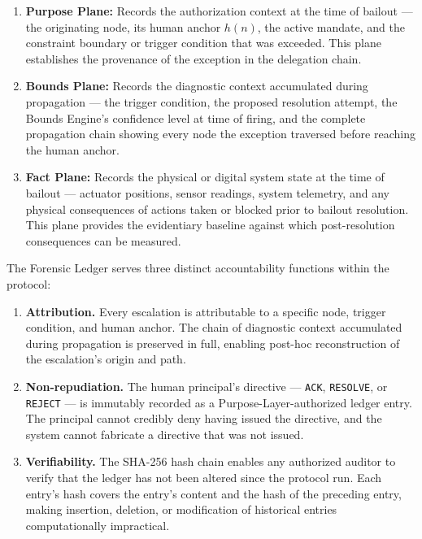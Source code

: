 \begin{enumerate}\itemsep=0pt
\item \textbf{Purpose Plane:} Records the authorization context at the time of bailout --- the originating node, its human anchor $h(n)$, the active mandate, and the constraint boundary or trigger condition that was exceeded. This plane establishes the provenance of the exception in the delegation chain.

\item \textbf{Bounds Plane:} Records the diagnostic context accumulated during propagation --- the trigger condition, the proposed resolution attempt, the Bounds Engine's confidence level at time of firing, and the complete propagation chain showing every node the exception traversed before reaching the human anchor.

\item \textbf{Fact Plane:} Records the physical or digital system state at the time of bailout --- actuator positions, sensor readings, system telemetry, and any physical consequences of actions taken or blocked prior to bailout resolution. This plane provides the evidentiary baseline against which post-resolution consequences can be measured.
\end{enumerate}

The Forensic Ledger serves three distinct accountability functions within the protocol:

\begin{enumerate}\itemsep=0pt
\item \textbf{Attribution.} Every escalation is attributable to a specific node, trigger condition, and human anchor. The chain of diagnostic context accumulated during propagation is preserved in full, enabling post-hoc reconstruction of the escalation's origin and path.

\item \textbf{Non-repudiation.} The human principal's directive --- \texttt{ACK}, \texttt{RESOLVE}, or \texttt{REJECT} --- is immutably recorded as a Purpose-Layer-authorized ledger entry. The principal cannot credibly deny having issued the directive, and the system cannot fabricate a directive that was not issued.

\item \textbf{Verifiability.} The SHA-256 hash chain enables any authorized auditor to verify that the ledger has not been altered since the protocol run. Each entry's hash covers the entry's content and the hash of the preceding entry, making insertion, deletion, or modification of historical entries computationally impractical.
\end{enumerate}

